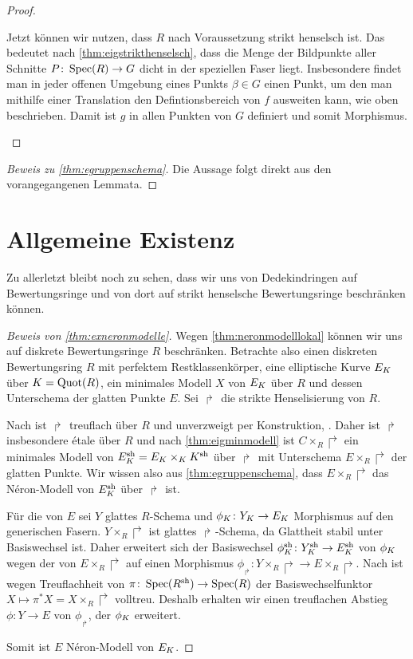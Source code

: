 \documentclass[german, bibliography=totoc]{scrreprt}
\begin{document}
\begin{Lemma}
\begin{proof}
\begin{description}
      Jetzt können wir nutzen, dass $R$ nach Voraussetzung strikt
      henselsch ist. Das bedeutet nach
      \ref{thm:eigstrikthenselsch}, dass die Menge der Bildpunkte
      aller Schnitte $P\colon\operatorname{Spec}(R)\to G$ dicht in der
      speziellen Faser liegt.
      Insbesondere findet man in jeder offenen Umgebung eines
      Punkts $\beta\in G$ einen Punkt, um den man mithilfe einer
      Translation den Defintionsbereich von $f$ ausweiten kann, wie
      oben beschrieben.
      Damit ist $g$ in allen Punkten von $G$ definiert und somit
      Morphismus.
    \end{description}
  \end{proof}
\end{Lemma}

\begin{proof}[Beweis zu \ref{thm:egruppenschema}]
  Die Aussage folgt direkt aus den vorangegangenen Lemmata.
\end{proof}


\section{Allgemeine Existenz}\label{chap:exneronmodellebeweis}
Zu allerletzt bleibt noch zu sehen, dass wir uns von Dedekindringen
auf Bewertungsringe und von dort auf strikt henselsche Bewertungsringe
beschränken können.
\begin{proof}[Beweis von \ref{thm:exneronmodelle}]
  Wegen \ref{thm:neronmodelllokal} können wir uns auf
  diskrete Bewertungsringe $R$ beschränken.
  Betrachte also einen diskreten Bewertungsring $R$ mit perfektem
  Restklassenkörper, eine elliptische Kurve $E_{K}$ über $K=\operatorname{Quot}(R)$,
  ein minimales Modell $X$ von $E_{K}$ über $R$ und dessen Unterschema
  der glatten Punkte $E$.
  Sei $\Rsh$ die strikte Henselisierung von $R$.

  Nach \cite[Chapter 2.4, Corollary 9]{neron} ist $\Rsh$ treuflach
  über $R$ und unverzweigt per Konstruktion,
  \cite[vgl.][Chapter 2.3, Proposition 11]{neron}.
  Daher ist $\Rsh$ insbesondere étale über $R$ und nach
  \ref{thm:eigminmodell} ist $C\times_R\Rsh$ ein minimales Modell von
  $E_\Ksh=E_\K\times_\K\Ksh$ über $\Rsh$ mit Unterschema
  $E\times_R\Rsh$ der glatten Punkte.
  Wir wissen also aus \ref{thm:egruppenschema}, dass $E\times_R\Rsh$
  das Néron-Modell von $E_\Ksh$ über $\Rsh$ ist.

  Für die \NAbbEig von $E$ sei $Y$ glattes $R$-Schema und
  $\phi_{K}\colon Y_{K}\to E_{K}$ Morphismus auf den generischen Fasern.
  $Y\times_R\Rsh$ ist glattes $\Rsh$-Schema, da Glattheit stabil unter
  Basiswechsel ist. Daher erweitert sich der Basiswechsel
  $\phi_\Ksh\colon Y_\Ksh\to E_\Ksh$ von $\phi_{K}$ wegen der \NAbbEig
  von $E\times_R\Rsh$ auf einen Morphismus $\phi_\Rsh\colon
  Y\times_R\Rsh\to E\times_R\Rsh$.
  Nach \cite[Chapter 6.1, Theorem 6]{neron} ist wegen Treuflachheit
  von $\pi\colon\operatorname{Spec}(R^{\text{sh}})\to\operatorname{Spec}(R)$ der Basiswechselfunktor
  $X\mapsto \pi^*X=X\times_R\Rsh$ volltreu. Deshalb erhalten wir einen
  treuflachen Abstieg $\phi\colon Y\to E$ von $\phi_\Rsh$, der
  $\phi_{K}$ erweitert.

  Somit ist $E$ Néron-Modell von $E_{K}$.
\end{proof}
\end{document}
